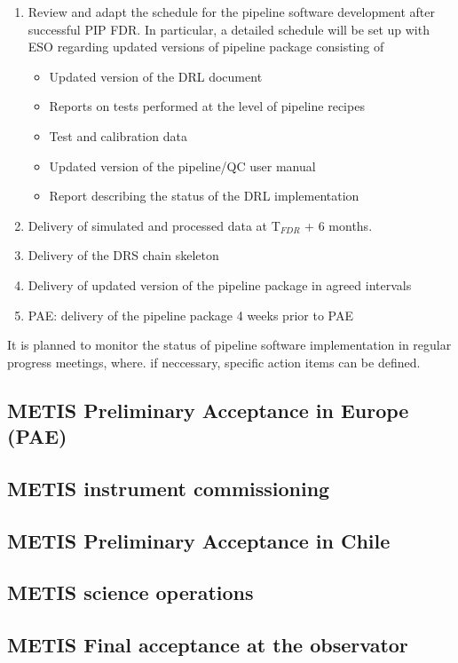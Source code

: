 \begin{enumerate}
    \item Review and adapt the schedule for the pipeline software development after successful PIP FDR. In particular, a detailed schedule will be set up with ESO regarding updated versions of pipeline package consisting of
    \begin{itemize}
        \item Updated version of the DRL document
        \item Reports on tests performed at the level of pipeline recipes
        \item Test and calibration data
        \item Updated version of the pipeline/QC user manual
        \item Report describing the status of the DRL implementation
    \end{itemize}
    \item Delivery of simulated and processed data at T$_{FDR}$ + 6 months.
    \item Delivery of the DRS chain skeleton
    \item Delivery of updated version of the pipeline package in agreed intervals
    \item PAE: delivery of the pipeline package 4 weeks prior to PAE
\end{enumerate}

It is planned to monitor the status of pipeline software implementation in regular progress meetings, where. if neccessary, specific action items can be defined.

\subsection{METIS Preliminary Acceptance in Europe (PAE)}
\label{ssec:pae_europe}

\subsection{METIS instrument commissioning}
\label{ssec:commissioning}

\subsection{METIS Preliminary Acceptance in Chile}
\label{ssec:pae_chile}

\subsection{METIS science operations}
\label{ssec:sciops}

\subsection{METIS Final acceptance at the observator}
\label{ssec:fao}